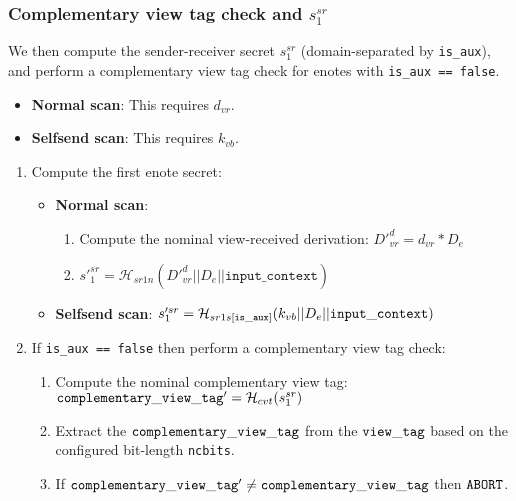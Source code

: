 \subsubsection{Complementary view tag check and $s^{sr}_1$}
\label{subsubsec:jamtis-balance-recovery-view-tag-complementary}

We then compute the sender-receiver secret $s^{sr}_1$ (domain-separated by {\tt is\_aux}), and perform a complementary view tag check for enotes with {\tt is\_aux == false}.

\begin{itemize}
    \item \textbf{Normal scan}: This requires $d_{vr}$.
    \item \textbf{Selfsend scan}: This requires $k_{vb}$.
\end{itemize}

\begin{enumerate}
    \item Compute the first enote secret:
        \begin{itemize}
            \item \textbf{Normal scan}:
            \begin{enumerate}
                \item Compute the nominal view-received derivation: $D'^d_{vr} = d_{vr} * D_e$
                \item $s'^{sr}_1 = \mathcal{H}_{sr1n}(D'^d_{vr} || D_e || \texttt{input\_context})$
            \end{enumerate}
            \item \textbf{Selfsend scan}: $s'^{sr}_1 = \mathcal{H}_{sr1s[{\tt is\_aux}]}(k_{vb} || D_e || {\tt input\_context})$
        \end{itemize}
    \item If {\tt is\_aux == false} then perform a complementary view tag check:
        \begin{enumerate}
            \item Compute the nominal complementary view tag: ${\tt complementary\_view\_tag'} = \mathcal{H}_{cvt}(s^{sr}_1)$
            \item Extract the ${\tt complementary\_view\_tag}$ from the ${\tt view\_tag}$ based on the configured bit-length {\tt ncbits}.
            
            \item If ${\tt complementary\_view\_tag'} \neq {\tt complementary\_view\_tag}$ then ${\tt ABORT}$.
        \end{enumerate}
\end{enumerate}


